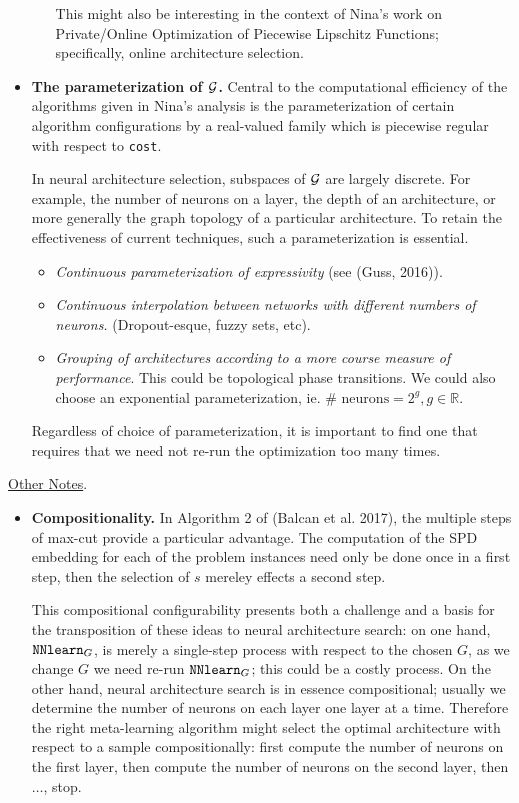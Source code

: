 \documentclass[11pt]{article}
\begin{document}
\begin{itemize}
\begin{itemize}
	This might also be interesting in the context of Nina's work on Private/Online Optimization of Piecewise Lipschitz Functions; specifically, online architecture selection.
	\end{itemize}

	\item \textbf{The parameterization of ${\mathcal G}$.} Central to the computational efficiency of the algorithms given in Nina's analysis is the parameterization of certain algorithm configurations by a real-valued family which is piecewise regular with respect to \verb|cost|.

	In neural architecture selection, subspaces of ${\mathcal G}$ are largely discrete. For example, the number of neurons on a layer, the depth of an architecture, or more generally the graph topology of a particular architecture. To retain the effectiveness of current techniques, such a parameterization is essential.

	\begin{itemize}
		\item \emph{Continuous parameterization of expressivity }(see (Guss, 2016)).

		\item \emph{Continuous interpolation between networks with different numbers of neurons.} (Dropout-esque, fuzzy sets, etc).

		\item \emph{Grouping of architectures according to a more course measure of performance}. This could be topological phase transitions. We could also choose an exponential parameterization, ie. $\# \text{ neurons} = 2^g, g\in \mathbb{R}.$

	\end{itemize}

	Regardless of choice of parameterization, it is important to find one that requires that we need not re-run the optimization too many times.


\end{itemize}

\medskip \noindent \underline{Other Notes}.
\begin{itemize}
\item \textbf{Compositionality.} In Algorithm 2 of (Balcan et al. 2017), the multiple steps of max-cut provide a particular advantage. The computation of the SPD embedding for each of the problem instances need only be done once in a first step, then the selection of $s$ mereley effects a second step.

 This compositional configurability presents both a challenge and a basis for the transposition of these ideas to neural architecture search: on one hand, $\verb!NNlearn!_G$, is merely a single-step process with respect to the chosen $G$, as we change $G$ we need re-run $\verb!NNlearn!_G$; this could be a costly process. On the other hand, neural architecture search is in essence compositional; usually we determine the number of neurons on each layer one layer at a time. Therefore the right meta-learning algorithm might select the optimal architecture with respect to a sample compositionally: first compute the number of neurons on the first layer, then compute the number of neurons on the second layer, then $\dots$, stop.
\end{itemize}
\end{document}
